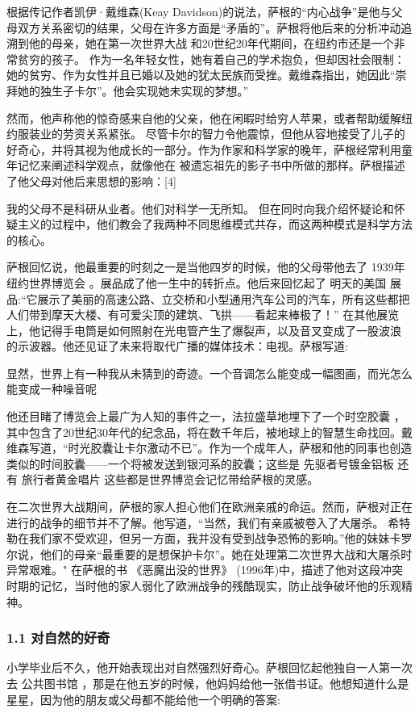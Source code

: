 根据传记作者凯伊·戴维森(Keay Davidson)的说法，萨根的“内心战争”是他与父母双方关系密切的结果，父母在许多方面是“矛盾的”。萨根将他后来的分析冲动追溯到他的母亲，她在第一次世界大战 和20世纪20年代期间，在纽约市还是一个非常贫穷的孩子。 作为一名年轻女性，她有着自己的学术抱负，但却因社会限制：她的贫穷、作为女性并且已婚以及她的犹太民族而受挫。戴维森指出，她因此“崇拜她的独生子卡尔”。他会实现她未实现的梦想。”

然而，他声称他的惊奇感来自他的父亲，他在闲暇时给穷人苹果，或者帮助缓解纽约服装业的劳资关系紧张。 尽管卡尔的智力令他震惊，但他从容地接受了儿子的好奇心，并将其视为他成长的一部分。作为作家和科学家的晚年，萨根经常利用童年记忆来阐述科学观点，就像他在 被遗忘祖先的影子书中所做的那样。萨根描述了他父母对他后来思想的影响：[4]

我的父母不是科研从业者。他们对科学一无所知。 但在同时向我介绍怀疑论和怀疑主义的过程中，他们教会了我两种不同思维模式共存，而这两种模式是科学方法的核心。

萨根回忆说，他最重要的时刻之一是当他四岁的时候，他的父母带他去了 1939年纽约世界博览会 。展品成了他一生中的转折点。他后来回忆起了 明天的美国 展品:“它展示了美丽的高速公路、立交桥和小型通用汽车公司的汽车，所有这些都把人们带到摩天大楼、有可爱尖顶的建筑、飞拱——看起来棒极了！” 在其他展览上，他记得手电筒是如何照射在光电管产生了爆裂声，以及音叉变成了一股波浪 的示波器。他还见证了未来将取代广播的媒体技术：电视。萨根写道:

显然，世界上有一种我从未猜到的奇迹。一个音调怎么能变成一幅图画，而光怎么能变成一种噪音呢

他还目睹了博览会上最广为人知的事件之一，法拉盛草地埋下了一个时空胶囊 ，其中包含了20世纪30年代的纪念品，将在数千年后，被地球上的智慧生命找回。戴维森写道，“时光胶囊让卡尔激动不已”。作为一个成年人，萨根和他的同事也创造类似的时间胶囊——一个将被发送到银河系的胶囊；这些是 先驱者号镀金铝板 还有 旅行者黄金唱片 这些都是世界博览会记忆带给萨根的灵感。

在二次世界大战期间，萨根的家人担心他们在欧洲亲戚的命运。然而，萨根对正在进行的战争的细节并不了解。他写道，“当然，我们有亲戚被卷入了大屠杀。 希特勒在我们家不受欢迎，但另一方面，我并没有受到战争恐怖的影响。”他的妹妹卡罗尔说，他们的母亲“最重要的是想保护卡尔”。她在处理第二次世界大战和大屠杀时异常艰难。" 在萨根的书 《恶魔出没的世界》 (1996年)中，描述了他对这段冲突时期的记忆，当时他的家人弱化了欧洲战争的残酷现实，防止战争破坏他的乐观精神。
\subsubsection{1.1 对自然的好奇}
小学毕业后不久，他开始表现出对自然强烈好奇心。萨根回忆起他独自一人第一次去 公共图书馆 ，那是在他五岁的时候，他妈妈给他一张借书证。他想知道什么是星星，因为他的朋友或父母都不能给他一个明确的答案:


